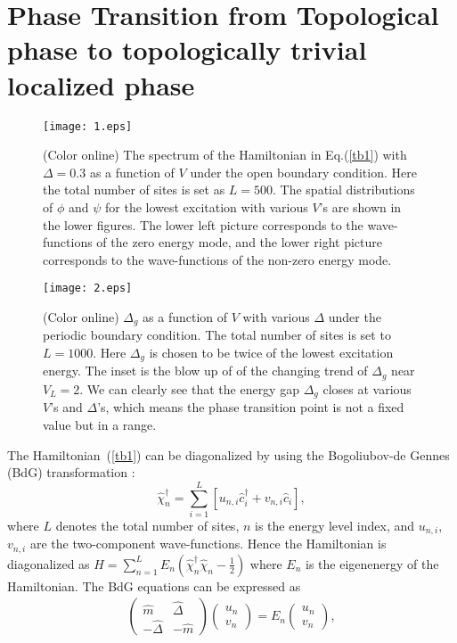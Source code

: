\documentclass[prb,showpacs,twocolumn,aps,superscriptaddress,a4paper]{revtex4-1}
\begin{document}
\section{Phase Transition from Topological phase to topologically trivial localized phase}
\label{n2}

\begin{figure}
  \centering
  \texttt{[image: 1.eps]}\\
  \caption{(Color online) The spectrum of the Hamiltonian in Eq.(\ref{tb1}) with $\Delta=0.3$ as a function of $V$ under the open boundary condition. Here the total number of sites is set as $L=500$. The spatial distributions of $\phi$ and $\psi$ for the lowest excitation with various $V$'s are shown in the lower figures. The lower left picture corresponds to the wave-functions of the zero energy mode, and the lower right picture corresponds to the wave-functions of the non-zero energy mode.}
  \label{001}
\end{figure}
\begin{figure}
  \centering
  \texttt{[image: 2.eps]}\\
  \caption{(Color online) $\Delta_g$ as a function of $V$ with various $\Delta$ under the periodic boundary condition. The total number of sites is set to $L=1000$. Here $\Delta_g$ is chosen to be twice of the lowest excitation energy. The inset is the blow up of of the changing trend of  $\Delta_g$ near $V_L=2$. We can clearly see that the energy gap $\Delta_g$ closes at various $V$'s and $\Delta$'s, which means the phase transition point is not a fixed value but in a range. }
  \label{002}
\end{figure}
The Hamiltonian~(\ref{tb1}) can be diagonalized by using the Bogoliubov-de
Gennes (BdG) transformation \cite{D19,L20}:
\begin{equation}
\hat{\chi} _{n}^{\dag } = \sum_{i=1}^{L}[u _{n,i} \hat{c}_{i}^{\dag } +
v _{n, i} \hat{c}_{i}], \label{quasi}
\end{equation}
where $L$ denotes the total number of sites, $n$ is the
energy level index, and
$u _{n, i}$, $v_{n, i}$ are the two-component wave-functions. Hence the
Hamiltonian is diagonalized as $H=\sum_{n=1}^{L}E _{n}(\hat{\chi}
_{n}^{\dag }\hat{\chi} _{n}-\frac{1}{2})$ where $E _{n}$ is the eigenenergy of the Hamiltonian.
The BdG equations can be expressed as
\begin{eqnarray}
 \left(
\begin{array}{cc}
\hat{m} & \hat{\Delta} \\
-\hat{\Delta} & -\hat{m}%
\end{array}
\right)
 \left(
\begin{array}{c}
u _{n} \\
v _{n}%
\end{array}%
\right) =
E _{n} \left(
\begin{array}{c}
u_n \\
v_{n}%
\end{array}
\right), \label{BDG}
\end{eqnarray}
\end{document}
